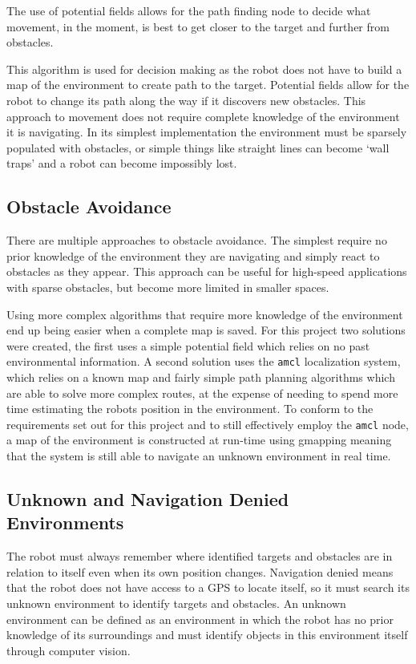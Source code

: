 \documentclass{article}[12]
\begin{document}
The use of potential fields allows for the path finding node to decide what movement, in the moment, is best to get closer to the target and further from obstacles. 
 
This algorithm is used for decision making as the robot does not have to build a map of the environment to create path to the target. \cite{bortoff2000path} Potential fields allow for the robot to change its path along the way if it discovers new obstacles. This approach to movement does not require complete knowledge of the environment it is navigating. In its simplest implementation the environment must be sparsely populated with obstacles, or simple things like straight lines can become `wall traps' and a robot can become impossibly lost.

	\subsection{Obstacle Avoidance}
	
	There are multiple approaches to obstacle avoidance. The simplest require no prior knowledge of the environment they are navigating and simply react to obstacles as they appear. This approach can be useful for high-speed applications with sparse obstacles, \cite{barry2018high} but become more limited in smaller spaces.
	
	Using more complex algorithms that require more knowledge of the environment end up being easier when a complete map is saved. For this project two solutions were created, the first uses a simple potential field which relies on no past environmental information. A second solution uses the \texttt{amcl} localization system, which relies on a known map and fairly simple path planning algorithms which are able to solve more complex routes, at the expense of needing to spend more time estimating the robots position in the environment.\cite{doucet_freitas_gordon_2001} To conform to the requirements set out for this project and to still effectively employ the \texttt{amcl} node, a map of the environment is constructed at run-time using gmapping meaning that the system is still able to navigate an unknown environment in real time.

	\subsection{Unknown and Navigation Denied Environments}

	The robot must always remember where identified targets and obstacles are in relation to itself even when its own position changes. Navigation denied means that the robot does not have access to a GPS to locate itself, so it must search its unknown environment to identify targets and obstacles. An unknown environment can be defined as an environment in which the robot has no prior knowledge of its surroundings and must identify objects in this environment itself through computer vision. 
	
\end{document}
